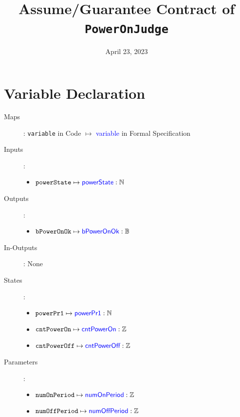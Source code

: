 \documentclass[fleqn,a4paper]{article}
\newcommand\var[1]{\texttt{#1}}
\newcommand\Var[1]{\textcolor{blue}{\textsf{#1}}}
\begin{document}
\title{Assume/Guarantee Contract of \texttt{PowerOnJudge}}
\author{}

\date{April 23, 2023}

\maketitle

\section{Variable Declaration}

\begin{description}

\item[Maps]:
\var{variable} in Code $\mapsto$ \Var{variable} in Formal Specification

\item[Inputs]:
\begin{itemize}
\item $\var{powerState} \mapsto \Var{powerState} : \mathbb{N}$
\end{itemize}

\item[Outputs]:
\begin{itemize}
\item $\var{bPowerOnOk} \mapsto \Var{bPowerOnOk} : \mathbb{B}$
\end{itemize}

\item[In-Outputs]: None

\item[States]:
\begin{itemize}
\item $\var{powerPr1} \mapsto \Var{powerPr1} : \mathbb{N}$
\item $\var{cntPowerOn} \mapsto \Var{cntPowerOn} : \mathbb{Z}$
\item $\var{cntPowerOff} \mapsto \Var{cntPowerOff} : \mathbb{Z}$
\end{itemize}

\item[Parameters]:
\begin{itemize}
\item $\var{numOnPeriod} \mapsto \Var{numOnPeriod} : \mathbb{Z}$
\item $\var{numOffPeriod} \mapsto \Var{numOffPeriod} : \mathbb{Z}$
\end{itemize}

\end{description}
\end{document}
